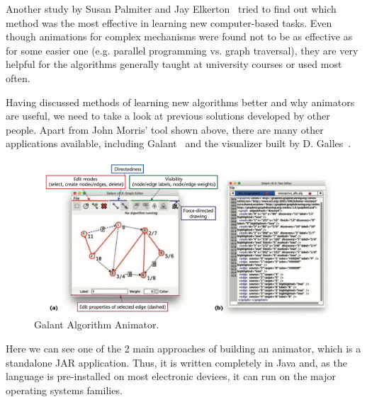 \documentclass{l4proj}
\begin{document}
Another study by Susan Palmiter and Jay Elkerton~\cite{palmiter-elkerton} tried to find out which method was the most effective in learning new computer-based tasks. Even though animations for complex mechanisms were found not to be as effective as for some easier one (e.g. parallel programming vs. graph traversal), they are very helpful for the algorithms generally taught at university courses or used most often.

Having discussed methods of learning new algorithms better and why animators are useful, we need to take a look at previous solutions developed by other people. Apart from John Morris' tool shown above, there are many other applications available, including Galant~\cite{galant} and the visualizer built by D. Galles~\cite{galles}.

\pagebreak

\begin{figure}[!ht]
\centering
\includegraphics[scale=0.4]{galant}
\caption{Galant Algorithm Animator.}
\label{fig:galant}
\end{figure}

Here we can see one of the 2 main approaches of building an animator, which is a standalone JAR application. Thus, it is written completely in Java and, as the language is pre-installed on most electronic devices, it can run on the major operating systems families.
\end{document}

